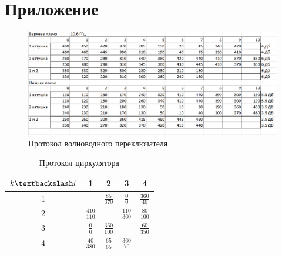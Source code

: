 \newpage
\section{Приложение}
\begin{figure}[H]
    \centering
    \includegraphics[width = 1\linewidth]{imgs/temp/005.png}
    \caption{Протокол волноводного переключателя}
    \label{fig:5}
\end{figure}

\begin{table}[h!]
    \centering
    \begin{tabular}{|c|c|c|c|c|}
    \hline
     $k \textbackslash i$ & 1 & 2 & 3 & 4 \\ \hline
    1 & \cellcolor{black!70}  & $\frac{85}{370}$ & $\frac{0}{0}$& $\frac{360}{40}$  \\ \hline
    2 & $\frac{410}{110}$  &\cellcolor{black!70}   & $\frac{110}{360}$  & $\frac{80}{100}$  \\ \hline
    3 & $\frac{0}{0}$  & $\frac{360}{100}$  & \cellcolor{black!70}  &  $\frac{60}{350}$ \\ \hline
    4 & $\frac{40}{380}$  & $\frac{65}{65}$  & $\frac{360}{70}$  & \cellcolor{black!70} \\ \hline
    \end{tabular}
    \caption{Протокол циркулятора}
    \label{tab:phaser}
    \end{table}


